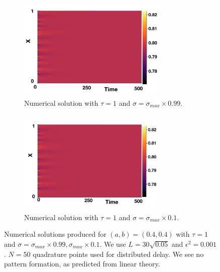 \begin{figure}[H]
    \centering
    \begin{subfigure}[b]{0.45\textwidth}
        \centering
        \includegraphics[width=7cm,height=5cm]{distp2sig1.png}
        \caption{Numerical solution with $\tau=1$ and $\sigma=\sigma_{max}\times0.99$.}
        \label{}
    \end{subfigure}
    \hfill
    \begin{subfigure}[b]{0.45\textwidth}
        \centering
        \includegraphics[width=7cm,height=5cm]{distp2sig2.png}
        \caption{Numerical solution with $\tau=1$ and $\sigma=\sigma_{max}\times0.1$.}
        \label{}
    \end{subfigure}
    \caption{Numerical solutions produced for $(a,b)=(0.4,0.4)$ with $\tau=1$ and $\sigma=\sigma_{max}\times0.99, \sigma_{max}\times0.1$. We use $L=30\sqrt{0.05}$ and $\epsilon^2=0.001$. $N=50$ quadrature points used for distributed delay. We see no pattern formation, as predicted from linear theory.}
    \label{fig:testdist2}
\end{figure}
